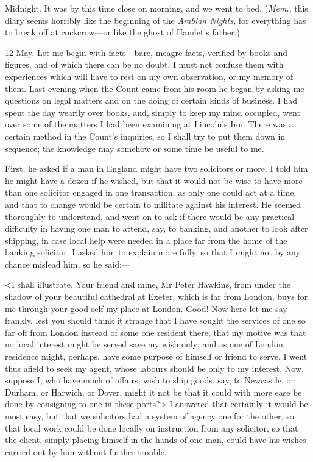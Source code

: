 \begin{diary}{Midnight.}
It was by this time close on morning, and we went to bed. (\textit{Mem.}, this diary seems horribly like the beginning of the \textit{Arabian Nights,} for everything has to break off at cockcrow—or like the ghost of Hamlet's father.)
\end{diary}
 
\begin{diary}{12 May.}
Let me begin with facts—bare, meagre facts, verified by books and figures, and of which there can be no doubt. I must not confuse them with experiences which will have to rest on my own observation, or my memory of them. Last evening when the Count came from his room he began by asking me questions on legal matters and on the doing of certain kinds of business. I had spent the day wearily over books, and, simply to keep my mind occupied, went over some of the matters I had been examining at Lincoln's Inn. There was a certain method in the Count's inquiries, so I shall try to put them down in sequence; the knowledge may somehow or some time be useful to me.

First, he asked if a man in England might have two solicitors or more. I told him he might have a dozen if he wished, but that it would not be wise to have more than one solicitor engaged in one transaction, as only one could act at a time, and that to change would be certain to militate against his interest. He seemed thoroughly to understand, and went on to ask if there would be any practical difficulty in having one man to attend, say, to banking, and another to look after shipping, in case local help were needed in a place far from the home of the banking solicitor. I asked him to explain more fully, so that I might not by any chance mislead him, so he said:—

<I shall illustrate. Your friend and mine, Mr Peter Hawkins, from under the shadow of your beautiful cathedral at Exeter, which is far from London, buys for me through your good self my place at London. Good! Now here let me say frankly, lest you should think it strange that I have sought the services of one so far off from London instead of some one resident there, that my motive was that no local interest might be served save my wish only; and as one of London residence might, perhaps, have some purpose of himself or friend to serve, I went thus afield to seek my agent, whose labours should be only to my interest. Now, suppose I, who have much of affairs, wish to ship goods, say, to Newcastle, or Durham, or Harwich, or Dover, might it not be that it could with more ease be done by consigning to one in these ports?> I answered that certainly it would be most easy, but that we solicitors had a system of agency one for the other, so that local work could be done locally on instruction from any solicitor, so that the client, simply placing himself in the hands of one man, could have his wishes carried out by him without further trouble.


\end{diary}
